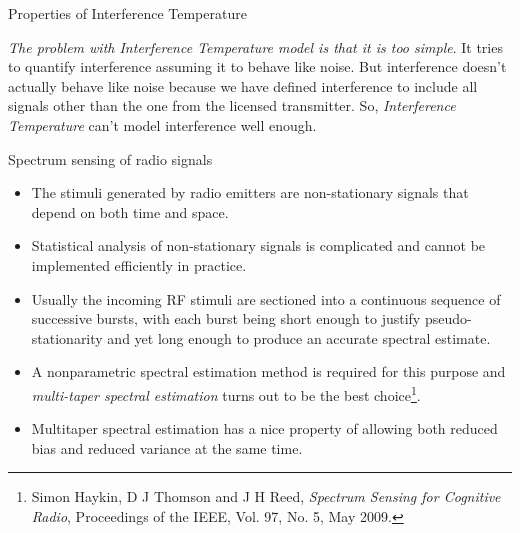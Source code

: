 \documentclass[mathserif]{beamer}
\begin{document}
\begin{frame}{Properties of Interference Temperature}

\emph{The problem with Interference Temperature model is that it is too simple}. It tries to quantify interference assuming it to behave like noise. But interference doesn't actually behave like noise because we have defined interference to include all signals other than the one from the licensed transmitter. So, \emph{Interference Temperature} can't model interference well enough.

\end{frame}




\begin{frame}{Spectrum sensing of radio signals}


\begin{itemize}

	\pause
	\item The stimuli generated by radio emitters are non-stationary signals that depend on both time and space.
	\pause
	\item Statistical analysis of non-stationary signals is complicated and cannot be implemented efficiently in practice. 
	\pause
	\item Usually the incoming RF stimuli are sectioned into a continuous sequence of successive bursts, with each burst being short enough to justify pseudo-stationarity and yet long enough to produce an accurate spectral estimate.
	\pause
	\item A nonparametric spectral estimation method is required for this purpose and \emph{multi-taper spectral estimation} turns out to be the best choice\footnote{Simon Haykin, D J Thomson and J H Reed, \emph{Spectrum Sensing for Cognitive Radio}, Proceedings of the IEEE, Vol. 97, No. 5, May 2009.}. 
	\pause
	\item Multitaper spectral estimation has a nice property of allowing both reduced bias and reduced variance at the same time.

\end{itemize}
\end{frame}
\end{document}
